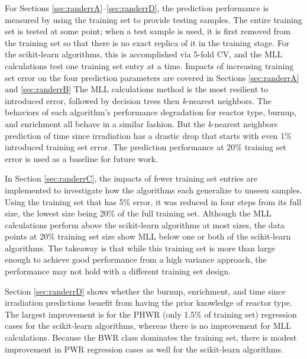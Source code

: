 For Sections \ref{sec:randerrA}--\ref{sec:randerrD}, the prediction performance
is measured by using the training set to provide testing samples. The entire
training set is tested at some point; when a test sample is used, it is first
removed from the training set so that there is no exact replica of it in the
training stage. For the scikit-learn algorithms, this is accomplished via
5-fold \gls{CV}, and the \gls{MLL} calculations test one training set entry at
a time.  Impacts of increasing training set error on the four prediction
parameters are covered in Sections \ref{sec:randerrA} and \ref{sec:randerrB}
The \gls{MLL} calculations method is the most resilient to introduced error,
followed by decision trees then \textit{k}-nearest neighbors. The behaviors of
each algorithm's performance degradation for reactor type, burnup, and
enrichment all behave in a similar fashion. But the \textit{k}-nearest
neighbors prediction of time since irradiation has a drastic drop that
starts with even 1\% introduced training set error. The prediction performance
at 20\% training set error is used as a baseline for future work. 

In Section \ref{sec:randerrC}, the impacts of fewer training set entries are
implemented to investigate how the algorithms each generalize to unseen samples. Using the
training set that has 5\% error, it was reduced in four steps from its full
size, the lowest size being 20\% of the full training set. Although the
\gls{MLL} calculations perform above the scikit-learn algorithms at most sizes,
the data points at 20\% training set size show \gls{MLL} below one or both of
the scikit-learn algorithms. The takeaway is that while this training set is
more than large enough to achieve good performance from a high variance
approach, the performance may not hold with a different training set design. 

Section \ref{sec:randerrD} shows whether the burnup, enrichment, and time since
irradiation predictions benefit from having the prior knowledge of reactor
type.  The largest improvement is for the \gls{PHWR} (only 1.5\% of training
set) regression cases for the scikit-learn algorithms, whereas there is no
improvement for \gls{MLL} calculations. Because the \gls{BWR} class dominates
the training set, there is modest improvement in \gls{PWR} regression cases as
well for the scikit-learn algorithms.


